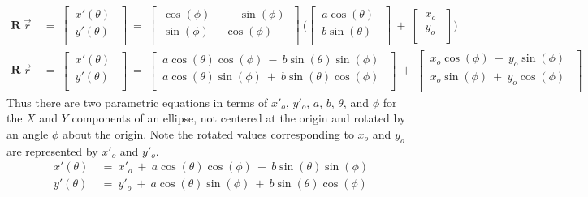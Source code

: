 \documentclass[12pt,runningheads]{article}
\begin{document}
\begin{align*}
\textbf{R}\ \vec{r}\ &=\ 
\begin{bmatrix}
\ x'(\theta)\ \ \\
\ y'(\theta)\ \ \\
\end{bmatrix}\ =\ 
\begin{bmatrix}
\ \cos(\phi)\ &\ -\sin(\phi)\ \\ 
\ \sin(\phi)\ &\ \cos(\phi)\ \\ 
\end{bmatrix}\ 
\bigg( \begin{bmatrix}
\ a\cos(\theta)\ \ \\
\ b\sin(\theta)\ \ \\
\end{bmatrix}\ +\ 
\begin{bmatrix}
\ x_{o}\ \ \\
\ y_{o}\ \ \\
\end{bmatrix} \bigg) \\
\textbf{R}\ \vec{r}\ &=\ 
\begin{bmatrix}
\ x'(\theta)\ \ \\
\ y'(\theta)\ \ \\
\end{bmatrix}\ =\ 
\begin{bmatrix}
\ a\cos(\theta)\cos(\phi)\ -\ b\sin(\theta)\sin(\phi)\ \ \\
\ a\cos(\theta)\sin(\phi)\ +\ b\sin(\theta)\cos(\phi)\ \ \\
\end{bmatrix}\ +\ 
\begin{bmatrix}
\ x_{o}\cos(\phi)\ -\ y_{o}\sin(\phi)\ \ \\
\ x_{o}\sin(\phi)\ +\ y_{o}\cos(\phi)\ \ \\
\end{bmatrix}
\end{align*}
Thus there are two parametric equations in terms of $x'_{o}$, $y'_{o}$, $a$, $b$, $\theta$, and $\phi$ for the $X$ and $Y$ components of an ellipse, not centered at the origin and rotated by an angle $\phi$ about the origin. Note the rotated values corresponding to $x_{o}$ and $y_{o}$ are represented by $x'_{o}$ and $y'_{o}$.
\begin{align*}
\ x'(\theta)\ &=\ x'_{o}\ +\ a\cos(\theta)\cos(\phi)\ -\ b\sin(\theta)\sin(\phi)\ \\
\ y'(\theta)\ &=\ y'_{o}\ +\ a\cos(\theta)\sin(\phi)\ +\ b\sin(\theta)\cos(\phi)\ \\
\end{align*}
\pagebreak
\end{document}
